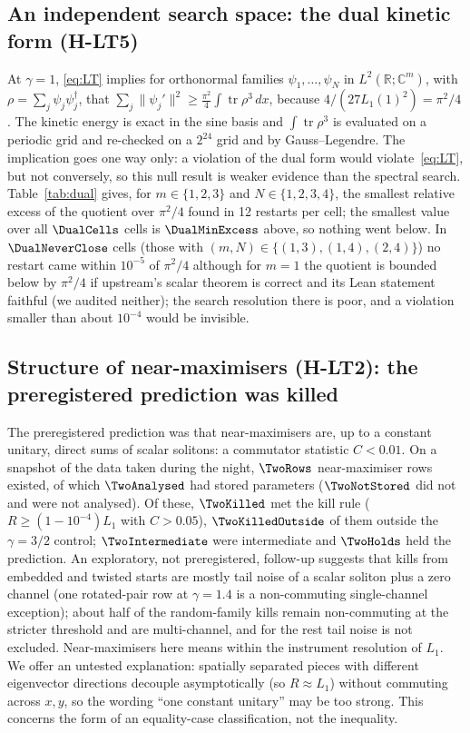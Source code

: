 \documentclass[11pt]{article}
\theoremstyle{remark}
\DeclareMathOperator{\tr}{tr}
\newcommand{\R}{\mathbb{R}}
\newcommand{\Lone}{L_1}
\begin{document}
\subsection{An independent search space: the dual kinetic form (H-LT5)}
At $\gamma=1$, \eqref{eq:LT} implies for orthonormal families $\psi_1,\dots,\psi_N$ in $L^2(\R;\mathbb C^m)$, with $\rho=\sum_j\psi_j\psi_j^\dagger$, that
$\sum_j\|\psi_j'\|^2\ge\frac{\pi^2}{4}\int\tr\rho^3\,dx$, because $4/(27\Lone(1)^2)=\pi^2/4$. The kinetic energy is exact in the sine basis and $\int\tr\rho^3$ is evaluated on a periodic grid and re-checked on a $2^{24}$ grid and by Gauss--Legendre. The implication goes one way only: a violation of the dual form would violate~\eqref{eq:LT}, but not conversely, so this null result is weaker evidence than the spectral search.
Table~\ref{tab:dual} gives, for $m\in\{1,2,3\}$ and $N\in\{1,2,3,4\}$, the smallest relative excess of the quotient over $\pi^2/4$ found in 12 restarts per cell; the smallest value over all $\DualCells$ cells is $\DualMinExcess$ above, so nothing went below.
In $\DualNeverClose$ cells (those with $(m,N)\in\{(1,3),(1,4),(2,4)\}$) no restart came within $10^{-5}$ of $\pi^2/4$ although for $m=1$ the quotient is bounded below by $\pi^2/4$ if upstream's scalar theorem is correct and its Lean statement faithful (we audited neither); the search resolution there is poor, and a violation smaller than about $10^{-4}$ would be invisible.
\begin{table}[h]\centering\small

\caption{Dual kinetic form (from \texttt{LT\_C/result.json}).}\label{tab:dual}
\end{table}

\subsection{Structure of near-maximisers (H-LT2): the preregistered prediction was killed}
The preregistered prediction was that near-maximisers are, up to a constant unitary, direct sums of scalar solitons: a commutator statistic $C<0.01$.
On a snapshot of the data taken during the night, $\TwoRows$ near-maximiser rows existed, of which $\TwoAnalysed$ had stored parameters ($\TwoNotStored$ did not and were not analysed). Of these, $\TwoKilled$ met the kill rule
($R\ge(1-10^{-4})\Lone$ with $C>0.05$), $\TwoKilledOutside$ of them outside the $\gamma=3/2$ control; $\TwoIntermediate$ were intermediate and $\TwoHolds$ held the prediction.
An exploratory, not preregistered, follow-up suggests that kills from embedded and twisted starts are mostly tail noise of a scalar soliton plus a zero channel (one rotated-pair row at $\gamma=1.4$ is a non-commuting single-channel exception);
about half of the random-family kills remain non-commuting at the stricter threshold and are multi-channel, and for the rest tail noise is not excluded. Near-maximisers here means within the instrument resolution of $\Lone$.
We offer an untested explanation: spatially separated pieces with different eigenvector directions decouple asymptotically (so $R\approx\Lone$) without commuting across $x,y$, so the wording ``one constant unitary'' may be too strong.
This concerns the form of an equality-case classification, not the inequality.
\end{document}
